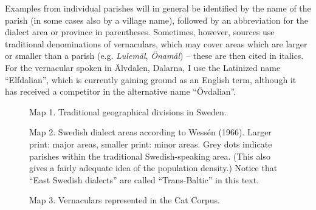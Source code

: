 
Examples from individual parishes will in general be identified by the name of the parish (in some cases also by a village name), followed by an abbreviation for the dialect area or province in parentheses. Sometimes, however, sources use traditional denominations of vernaculars, which may cover areas which are larger or smaller than a parish (e.g. \textit{Lulemål}, \textit{Önamål}) – these are then cited in italics. For the vernacular spoken in Älvdalen, Dalarna, I use the Latinized name “Elfdalian”, which is currently gaining ground as an English term, although it has received a competitor in the alternative name “Övdalian”.


\begin{figure}[h]



\label{bkm:Ref264031044}Map 1. Traditional geographical divisions in Sweden.




\end{figure}

\begin{figure}[h]



Map 2. Swedish dialect areas according to Wessén (1966). Larger print: major areas, smaller print: minor areas. Grey dots indicate parishes within the traditional Swedish-speaking area. (This also gives a fairly adequate idea of the population density.) Notice that “East Swedish dialects” are called “Trans-Baltic” in this text.




\end{figure}

\begin{figure}[h]



\label{bkm:Ref264030993}Map 3. Vernaculars represented in the Cat Corpus.




\end{figure}

